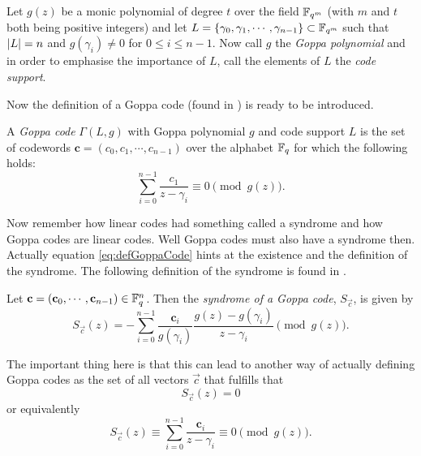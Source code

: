 Let $g\left(z\right)$ be a monic polynomial of degree $t$ over the field $\mathbb{F}_{q^m}$ (with $m$ and $t$ both being positive integers) and let $L = \left\{ \gamma_0, \gamma_1, \cdots, \gamma_{n-1} \right\} \subset \mathbb{F}_{q^m}$ such that $\left\vert L \right\vert = n$ and $g\left(\gamma_i\right) \neq 0$ for $0 \leq i \leq n-1$. Now call $g$ the \emph{Goppa polynomial} and in order to emphasise the importance of $L$, call the elements of $L$ the \emph{code support}\cite{EOS, vanlint}.

Now the definition of a Goppa code (found in \cite[p. 140]{vanlint}) is ready to be introduced.
\begin{defi}
\label{def:goppaCode}
	A \emph{Goppa code} $\Gamma \left(L,g\right)$ with Goppa polynomial $g$ and code support $L$ is the set of codewords $\mathbf{c} = \left(c_0, c_1, \cdots , c_{n-1}\right)$ over the alphabet $\mathbb{F}_q$ for which the following holds:
\begin{equation}
\label{eq:defGoppaCode}
	\sum\limits^{n-1}_{i = 0} \frac{c_1}{z - \gamma_i} \equiv 0 \pmod {g\left(z\right)}.
\end{equation}
\end{defi}

Now remember how linear codes had something called a syndrome and how Goppa codes are linear codes. Well Goppa codes must also have a syndrome then. Actually equation \cref{eq:defGoppaCode} hints at the existence and the definition of the syndrome. The following definition of the syndrome is found in \cite{EOS}.
\begin{defi}
	Let $\boldsymbol{\mathrm{c}} = \left(\mathbf{c}_0, \cdots , \mathbf{c}_{n-1}\right) \in \mathbb{F}_{q}^n$. Then the \emph{syndrome of a Goppa code}, $S_{\vec{c}}$, is given by
	\begin{equation*}
		S_{\vec{c}}\left(z\right) = - \sum\limits_{i=0}^{n-1}\frac{\mathbf{c}_i}{g\left(\gamma_i\right)} \frac{g\left(z\right) - g\left(\gamma_i\right)}{z - \gamma_i} \pmod {g\left(z\right)}.
	\end{equation*}
\end{defi}

The important thing here is that this can lead to another way of actually defining Goppa codes as the set of all vectors $\vec{c}$ that fulfills that
\[
	S_{\vec{c}}\left(z\right) = 0
\]
or equivalently
\begin{equation}
\label{eq:altSynForGoppa}
	S_{\vec{c}}\left(z\right) \equiv \sum\limits_{i=0}^{n-1} \frac{\mathbf{c}_i}{z - \gamma_i} \equiv 0 \pmod {g\left(z\right)}.
\end{equation}



